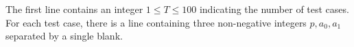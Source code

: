 The first line contains an integer $1\leq T\leq 100$ 
indicating the number of test cases.
For each test case, there is a line containing 
three non-negative integers $p, a_0, a_1$ 
separated by a single blank.
